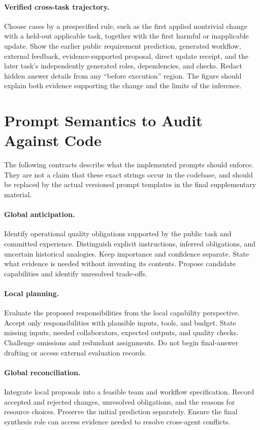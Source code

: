 \paragraph{Verified cross-task trajectory.}
Choose cases by a prespecified rule, such as the first applied nontrivial change with a held-out applicable task, together with the first harmful or inapplicable update. Show the earlier public requirement prediction, generated workflow, external feedback, evidence-supported proposal, direct update receipt, and the later task's independently generated roles, dependencies, and checks. Redact hidden answer details from any ``before execution'' region. The figure should explain both evidence supporting the change and the limits of the inference.

\section{Prompt Semantics to Audit Against Code}

The following contracts describe what the implemented prompts should enforce. They are not a claim that these exact strings occur in the codebase, and should be replaced by the actual versioned prompt templates in the final supplementary material.

\paragraph{Global anticipation.}
Identify operational quality obligations supported by the public task and committed experience. Distinguish explicit instructions, inferred obligations, and uncertain historical analogies. Keep importance and confidence separate. State what evidence is needed without inventing its contents. Propose candidate capabilities and identify unresolved trade-offs.

\paragraph{Local planning.}
Evaluate the proposed responsibilities from the local capability perspective. Accept only responsibilities with plausible inputs, tools, and budget. State missing inputs, needed collaborators, expected outputs, and quality checks. Challenge omissions and redundant assignments. Do not begin final-answer drafting or access external evaluation records.

\paragraph{Global reconciliation.}
Integrate local proposals into a feasible team and workflow specification. Record accepted and rejected changes, unresolved obligations, and the reasons for resource choices. Preserve the initial prediction separately. Ensure the final synthesis role can access evidence needed to resolve cross-agent conflicts.

